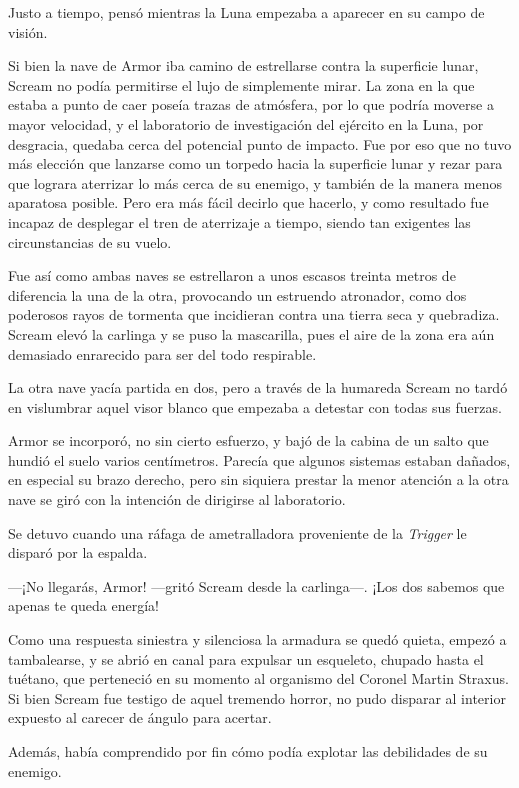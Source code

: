 Justo a tiempo, pensó mientras la Luna empezaba a aparecer en su campo de visión.

Si bien la nave de Armor iba camino de estrellarse contra la superficie lunar, Scream no podía permitirse el lujo de simplemente mirar. La zona en la que estaba a punto de caer poseía trazas de atmósfera, por lo que podría moverse a mayor velocidad, y el laboratorio de investigación del ejército en la Luna, por desgracia, quedaba cerca del potencial punto de impacto. Fue por eso que no tuvo más elección que lanzarse como un torpedo hacia la superficie lunar y rezar para que lograra aterrizar lo más cerca de su enemigo, y también de la manera menos aparatosa posible. Pero era más fácil decirlo que hacerlo, y como resultado fue incapaz de desplegar el tren de aterrizaje a tiempo, siendo tan exigentes las circunstancias de su vuelo.

Fue así como ambas naves se estrellaron a unos escasos treinta metros de diferencia la una de la otra, provocando un estruendo atronador, como dos poderosos rayos de tormenta que incidieran contra una tierra seca y quebradiza. Scream elevó la carlinga y se puso la mascarilla, pues el aire de la zona era aún demasiado enrarecido para ser del todo respirable.

La otra nave yacía partida en dos, pero a través de la humareda Scream no tardó en vislumbrar aquel visor blanco que empezaba a detestar con todas sus fuerzas.

Armor se incorporó, no sin cierto esfuerzo, y bajó de la cabina de un salto que hundió el suelo varios centímetros. Parecía que algunos sistemas estaban dañados, en especial su brazo derecho, pero sin siquiera prestar la menor atención a la otra nave se giró con la intención de dirigirse al laboratorio.

Se detuvo cuando una ráfaga de ametralladora proveniente de la \emph{Trigger} le disparó por la espalda.

---¡No llegarás, Armor! ---gritó Scream desde la carlinga---. ¡Los dos sabemos que apenas te queda energía!

Como una respuesta siniestra y silenciosa la armadura se quedó quieta, empezó a tambalearse, y se abrió en canal para expulsar un esqueleto, chupado hasta el tuétano, que perteneció en su momento al organismo del Coronel Martin Straxus. Si bien Scream fue testigo de aquel tremendo horror, no pudo disparar al interior expuesto al carecer de ángulo para acertar.

Además, había comprendido por fin cómo podía explotar las debilidades de su enemigo.

